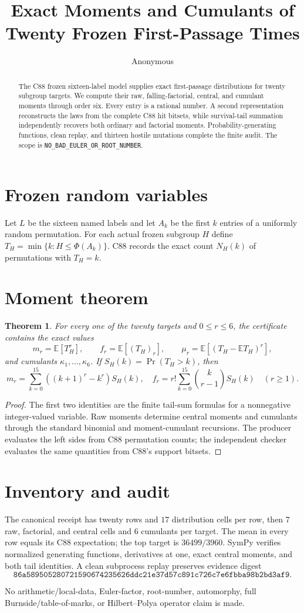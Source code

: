 \documentclass[10pt]{article}
\title{Exact Moments and Cumulants of Twenty Frozen First-Passage Times}
\author{Anonymous}
\date{}
\newtheorem{theorem}{Theorem}
\begin{document}
\maketitle
\begin{abstract}
The C88 frozen sixteen-label model supplies exact first-passage distributions
for twenty subgroup targets.  We compute their raw, falling-factorial, central,
and cumulant moments through order six.  Every entry is a rational number.  A
second representation reconstructs the laws from the complete C88 hit
bitsets, while survival-tail summation independently recovers both ordinary
and factorial moments.  Probability-generating functions, clean replay, and
thirteen hostile mutations complete the finite audit.  The scope is
\texttt{NO\_BAD\_EULER\_OR\_ROOT\_NUMBER}.
\end{abstract}

\section{Frozen random variables}
Let $L$ be the sixteen named labels and let $A_k$ be the first $k$ entries of
a uniformly random permutation.  For each actual frozen subgroup $H$ define
$T_H=\min\{k:H\leq\Phi(A_k)\}$.  C88 records the exact count $N_H(k)$ of
permutations with $T_H=k$.

\section{Moment theorem}
\begin{theorem}
For every one of the twenty targets and $0\leq r\leq6$, the certificate
contains the exact values
\[
m_r=\mathbb E[T_H^r],\qquad f_r=\mathbb E[(T_H)_r],\qquad
\mu_r=\mathbb E[(T_H-\mathbb ET_H)^r],
\]
and cumulants $\kappa_1,\ldots,\kappa_6$.  If
$S_H(k)=\Pr(T_H>k)$, then
\[
m_r=\sum_{k=0}^{15}((k+1)^r-k^r)S_H(k),\quad
f_r=r!\sum_{k=0}^{15}{k\choose r-1}S_H(k)\quad(r\geq1).
\]
\end{theorem}
\begin{proof}
The first two identities are the finite tail-sum formulas for a
nonnegative integer-valued variable.  Raw moments determine central moments
and cumulants through the standard binomial and moment-cumulant recursions.
The producer evaluates the left sides from C88 permutation counts; the
independent checker evaluates the same quantities from C88's support bitsets.
\end{proof}

\section{Inventory and audit}
The canonical receipt has twenty rows and $17$ distribution cells per row,
then $7$ raw, factorial, and central cells and $6$ cumulants per target.  The
mean in every row equals its C88 expectation; the top target is
$36499/3960$.  SymPy verifies normalized generating functions, derivatives at
one, exact central moments, and both tail identities.  A clean subprocess
replay preserves evidence digest
\[
\texttt{86a589505280721590674235626ddc21e37d57c891c726c7e6fbba98b2bd3af9}.
\]

No arithmetic/local-data, Euler-factor, root-number, automorphy,
full Burnside/table-of-marks, or Hilbert--Polya operator claim is made.
\end{document}

